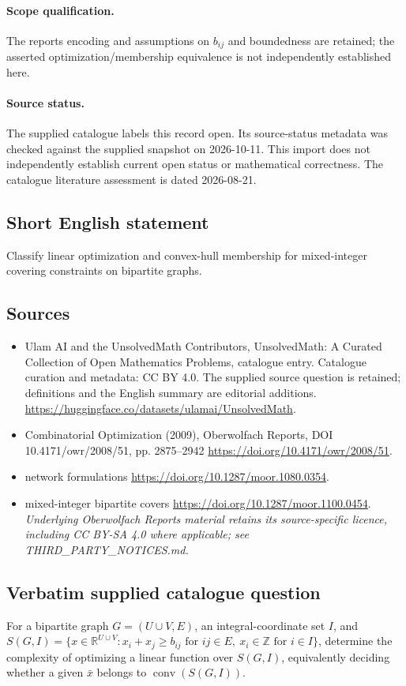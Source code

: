 \documentclass[11pt]{article}
\begin{document}
\paragraph{Scope qualification.}
The report\textquotesingle s encoding and assumptions on $b_{ij}$ and boundedness are retained; the asserted optimization/membership equivalence is not independently established here.
\paragraph{Source status.}
The supplied catalogue labels this record open. Its source-status metadata was checked against the supplied snapshot on 2026-10-11. This import does not independently establish current open status or mathematical correctness. The catalogue literature assessment is dated 2026-08-21.
\subsection{Short English statement}
Classify linear optimization and convex-hull membership for mixed-integer covering constraints on bipartite graphs.
\subsection{Sources}
\begin{itemize}
\item[S1] Ulam AI and the UnsolvedMath Contributors, UnsolvedMath: A Curated Collection of Open Mathematics Problems, catalogue entry. Catalogue curation and metadata: CC BY 4.0. The supplied source question is retained; definitions and the English summary are editorial additions.
\url{https://huggingface.co/datasets/ulamai/UnsolvedMath}.
\item[S2] Combinatorial Optimization (2009), Oberwolfach Reports, DOI 10.4171/owr/2008/51, pp. 2875--2942
\url{https://doi.org/10.4171/owr/2008/51}.
\item[S3] network formulations
\url{https://doi.org/10.1287/moor.1080.0354}.
\item[S4] mixed-integer bipartite covers
\url{https://doi.org/10.1287/moor.1100.0454}.
\textit{Underlying Oberwolfach Reports material retains its source-specific licence, including CC BY-SA 4.0 where applicable; see THIRD\_PARTY\_NOTICES.md.}
\end{itemize}
\subsection{Verbatim supplied catalogue question}
For a bipartite graph $G=(U\cup V,E)$, an integral-coordinate set $I$, and $S(G,I)=\{x\in\mathbb{R}^{U\cup V}:x_i+x_j\geq b_{ij}\text{ for }ij\in E,\ x_i\in\mathbb{Z}\text{ for }i\in I\}$, determine the complexity of optimizing a linear function over $S(G,I)$, equivalently deciding whether a given $\bar{x}$ belongs to $\operatorname{conv}(S(G,I))$.
\end{document}

